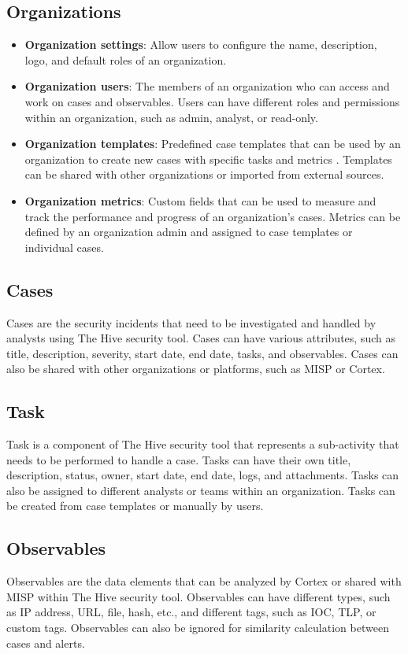 \subsection{Organizations}
\begin{itemize} 
\item \textbf{Organization settings}: Allow users to configure the name, description, logo, and default roles of an organization. 
\item \textbf{Organization users}: The members of an organization who can access and work on cases and observables. Users can have different roles and permissions within an organization, such as admin, analyst, or read-only. 
\item \textbf{Organization templates}: Predefined case templates that can be used by an organization to create new cases with specific tasks and metrics . Templates can be shared with other organizations or imported from external sources. 
\item \textbf{Organization metrics}: Custom fields that can be used to measure and track the performance and progress of an organization’s cases. Metrics can be defined by an organization admin and assigned to case templates or individual cases. 
\end{itemize}

\subsection{Cases}

Cases are the security incidents that need to be investigated and handled by analysts using The Hive security tool. Cases can have various attributes, such as title, description, severity, start date, end date, tasks, and observables. Cases can also be shared with other organizations or platforms, such as MISP or Cortex.

\subsection{Task}
Task is a component of The Hive security tool that represents a sub-activity that needs to be performed to handle a case. Tasks can have their own title, description, status, owner, start date, end date, logs, and attachments. Tasks can also be assigned to different analysts or teams within an organization. Tasks can be created from case templates or manually by users.

\subsection{Observables}
Observables are the data elements that can be analyzed by Cortex or shared with MISP within The Hive security tool. Observables can have different types, such as IP address, URL, file, hash, etc., and different tags, such as IOC, TLP, or custom tags. Observables can also be ignored for similarity calculation between cases and alerts.
